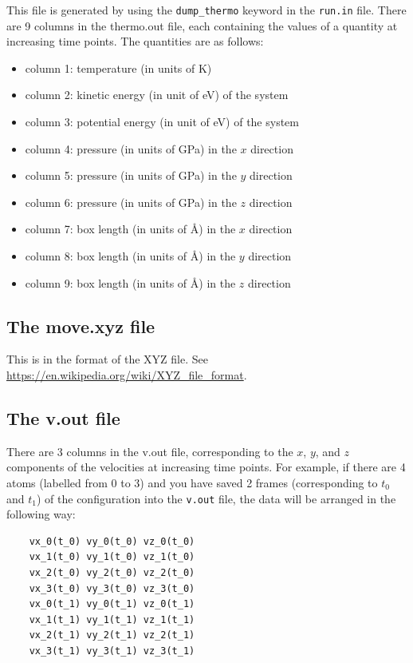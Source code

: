 \documentclass[12pt,a4paper]{report}
\begin{document}
This file is generated by using the \verb"dump_thermo" keyword in the \verb"run.in" file.
There are 9 columns in the thermo.out file, each containing the values of a quantity at increasing time points. The quantities are as follows:
\begin{itemize}
\item column 1: temperature (in units of K)
\item column 2: kinetic energy (in unit of eV) of the system
\item column 3: potential energy (in unit of eV) of the system
\item column 4: pressure (in units of GPa) in the $x$ direction
\item column 5: pressure (in units of GPa) in the $y$ direction
\item column 6: pressure (in units of GPa) in the $z$ direction
\item column 7: box length (in units of \AA) in the $x$ direction
\item column 8: box length (in units of \AA) in the $y$ direction
\item column 9: box length (in units of \AA) in the $z$ direction
\end{itemize}


\subsection{The move.xyz file}

This is in the format of the XYZ file. See \url{https://en.wikipedia.org/wiki/XYZ_file_format}.

\subsection{The v.out file}
There are 3 columns in the v.out file, corresponding to the $x$, $y$, and $z$ components of the velocities at increasing time points. For example, if there are 4 atoms (labelled from 0 to 3) and you have saved 2 frames (corresponding to $t_0$ and $t_1$) of the configuration into the \verb"v.out" file, the data will be arranged in the following way:
\begin{verbatim}
    vx_0(t_0) vy_0(t_0) vz_0(t_0)
    vx_1(t_0) vy_1(t_0) vz_1(t_0)
    vx_2(t_0) vy_2(t_0) vz_2(t_0)
    vx_3(t_0) vy_3(t_0) vz_3(t_0)
    vx_0(t_1) vy_0(t_1) vz_0(t_1)
    vx_1(t_1) vy_1(t_1) vz_1(t_1)
    vx_2(t_1) vy_2(t_1) vz_2(t_1)
    vx_3(t_1) vy_3(t_1) vz_3(t_1)
\end{verbatim}
\end{document}
